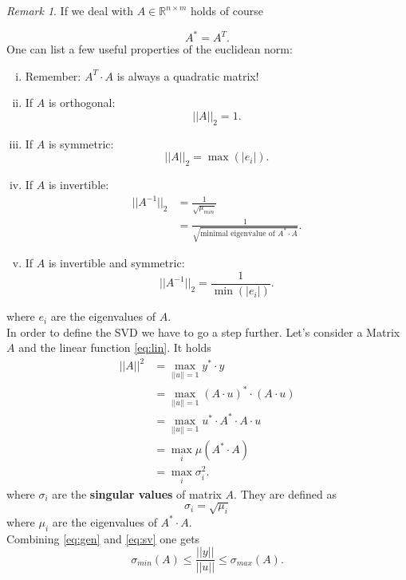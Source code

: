 \documentclass[a4paper,12 pt]{article}
\numberwithin{equation}{section}
\theoremstyle{definition}
\theoremstyle{remark}
\newtheorem*{bmk}{Remark}
\theoremstyle{definition}
\theoremstyle{definition}
\theoremstyle{definition}
\theoremstyle{remark}
\begin{document}
\begin{bmk}
If we deal with $A\in \mathbb{R}^{n\times m}$ holds of course
\end{bmk}
\begin{equation}
A^*=A^T.
\end{equation}
One can list a few useful properties of the euclidean norm:
\begin{enumerate}[(i)]
\item Remember: $A^T\cdot A$ is always a quadratic matrix!
\item If $A$ is orthogonal:
\begin{equation}
||A||_2=1.
\end{equation}
\item If $A$ is symmetric:
\begin{equation}
||A||_2=\max(|e_i|).
\end{equation}
\item If $A$ is invertible:
\begin{equation}
\begin{split}
||A^{-1}||_2&=\frac{1}{\sqrt{\mu_{min}}}\\
&=\frac{1}{\sqrt{\text{minimal eigenvalue of }A^*\cdot A}}.
\end{split}
\end{equation}
\item If $A$ is invertible and symmetric:
\begin{equation}
||A^{-1}||_2=\frac{1}{\min(|e_i|)}.
\end{equation}
\end{enumerate}
where $e_i$ are the eigenvalues of $A$. \\
In order to define the SVD we have to go a step further. Let's consider a Matrix $A$ and the linear function \ref{eq:lin}. It holds
\begin{equation}
\begin{split}
||A||^2&=\max_{||u||=1}y^*\cdot y\\
&=\max_{||u||=1} (A\cdot u)^*\cdot (A\cdot u)\\
&=\max_{||u||=1}u^*\cdot A^*\cdot A\cdot u\\
&=\max_i \mu(A^*\cdot A)\\
&= \max_i \sigma_i^2.
\end{split}
\end{equation}
where $\sigma_i$ are the \textbf{singular values} of matrix $A$. They are defined as
\begin{equation}
\sigma_i=\sqrt{\mu_i}
\label{eq:sv}
\end{equation}
where $\mu_i$ are the eigenvalues of $A^*\cdot A$. \\
Combining \ref{eq:gen} and \ref{eq:sv} one gets
\begin{equation}
\sigma_{min}(A)\leq \frac{||y||}{||u||}\leq \sigma_{max}(A).
\end{equation}
\end{document}
